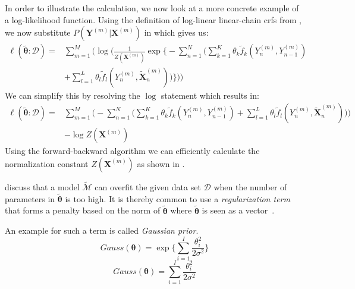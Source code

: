 In order to illustrate the calculation, we now look at a more concrete example of a log-likelihood function.
Using the definition of log-linear \glspl{linear-chain crf} from , we now substitute $P(\bm{Y}^{(m)}|\bm{X}^{(m)})$ in  which gives us:
\begin{equation}
  \label{equ:log-likelihood-linear-chain-crf-log-linear-1}
  \begin{split}
    \ell(\bm{\tilde{\theta}}:\mathcal{D}) = & \sum_{m=1}^M \Bigg(\log \bigg(\frac{1}{Z(\bm{X}^{(m)})}\exp\Bigg\{ -\sum_{n=1}^N \Big(\sum_{k=1}^K\theta_k \tilde{f}_k(Y_n^{(m)},Y_{n-1}^{(m)}) \\
    & +\sum_{l=1}^L\theta_l \tilde{f}_l(Y_n^{(m)},\bm{\tilde{X}}_n^{(m)})\Big)\Bigg\}\bigg)\Bigg)
 \end{split}
\end{equation}
We can simplify this by resolving the $\log$ statement which results in:
\begin{equation}
  \label{equ:log-likelihood-linear-chain-crf-log-linear-2}
  \begin{split}
    \ell(\bm{\tilde{\theta}}:\mathcal{D}) = & \sum_{m=1}^M \bigg(-\sum_{n=1}^N \Big(\sum_{k=1}^K\theta_k \tilde{f}_k(Y_n^{(m)},Y_{n-1}^{(m)})+\sum_{l=1}^L\theta_l \tilde{f}_l(Y_n^{(m)},\bm{\tilde{X}}_n^{(m)})\Big)\Bigg) \\
    & -\log Z(\bm{X}^{(m)})
 \end{split}
\end{equation}
Using the forward-backward algorithm we can efficiently calculate the normalization constant $Z(\bm{X}^{(m)})$ as shown in .

\bigskip

\citet{sutton2010introduction} discuss that a model $\tilde{\mathcal{M}}$ can overfit the given data set $\mathcal{D}$ when the number of parameters in $\bm{\tilde{\theta}}$ is too high.
It is thereby common to use a \textit{regularization term} that forms a penalty based on the norm of $\bm{\tilde{\theta}}$ where $\bm{\tilde{\theta}}$ is seen as a vector~\citep{koller2009probabilistic,sutton2010introduction}.

An example for such a term is called \textit{Gaussian prior}.
\begin{equation}
  \label{equ:gaussian-prior}
  Gauss(\bm{\theta})=\exp\Bigg\{\sum_{i=1}^I\frac{\theta_i^2}{2\sigma^2}\Bigg\}
\end{equation}
\begin{equation}
  \label{equ:gaussian-prior}
  Gauss(\bm{\theta})=\sum_{i=1}^I\frac{\theta_i^2}{2\sigma^2}
\end{equation}


